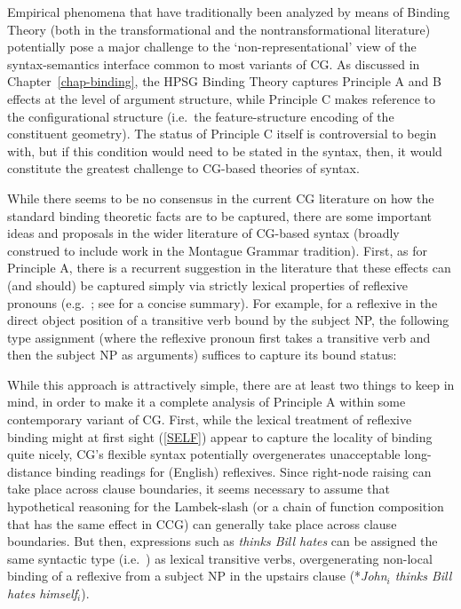 \documentclass[output=paper]{langsci/langscibook}
\begin{document}
Empirical phenomena that have traditionally been analyzed by means of
Binding Theory (both in the transformational and the
nontransformational literature) potentially pose a major challenge to
the `non-representational' view of the syntax-semantics interface
common to most variants of CG. As discussed in Chapter~\ref{chap-binding}, the HPSG
Binding Theory captures Principle A and B effects at the level of
argument structure, while Principle C makes reference to the
configurational structure (i.e.\  the feature-structure encoding of the
constituent geometry). The status of Principle C itself is
controversial to begin with, but if this condition would need to be
stated in the syntax, then, it would constitute the greatest challenge
to CG-based theories of syntax.

While there seems to be no consensus in the current CG literature on
how the standard binding theoretic facts are to be captured, there are
some important ideas and proposals in the wider literature of CG-based
syntax (broadly construed to include work in the Montague Grammar
tradition). First, as for Principle A, there is a recurrent suggestion
in the literature that these effects can (and should) be captured
simply via strictly lexical properties of reflexive pronouns
(e.g.\  \citet{szabolcsi1992}; see \citet{buringbinding} for a concise summary).
For example, for a reflexive in the direct object position
of a transitive verb bound by the subject NP,
the following type assignment (where the reflexive pronoun first takes
a transitive verb and then the subject NP as arguments) suffices to
capture its bound status:

\begin{exe}
 \ex\label{SELF}
\end{exe}
While this approach is attractively simple, there are at least two
things to keep in mind, in order to make it a complete analysis of
Principle A within some contemporary variant of CG. First, while the
lexical treatment of reflexive binding might at first sight (\ref{SELF})
appear to capture the locality of binding quite nicely, CG's flexible
syntax potentially overgenerates unacceptable long-distance binding
readings for (English) reflexives. Since right-node raising can take
place across clause boundaries,  it seems necessary to
assume that hypothetical reasoning for the Lambek-slash
(or a chain of function composition that has the same effect in CCG)
can generally take place across clause boundaries. But then,
expressions such as \textit{thinks Bill hates} can be assigned
the same syntactic type (i.e.\  ) as lexical transitive verbs,
overgenerating non-local binding of a reflexive from a subject NP in
the upstairs clause (*\textit{John\ensuremath{_i} thinks Bill hates {himself\ensuremath{_i}}}).
\end{document}
